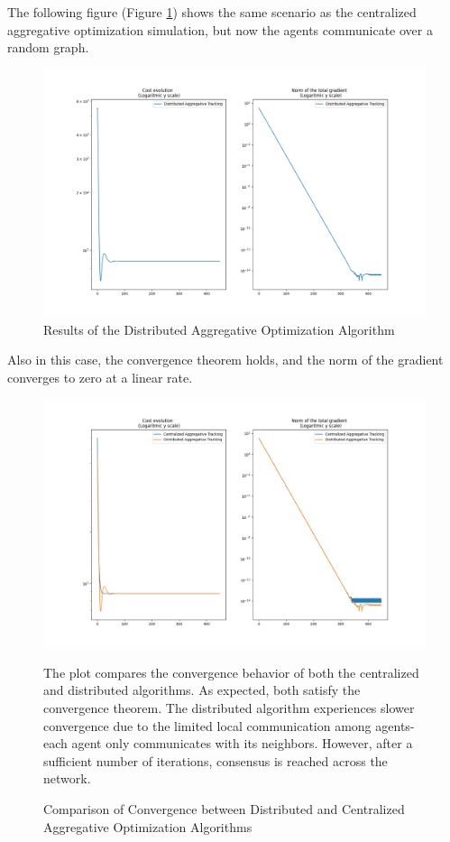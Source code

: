 \noindent The following figure (Figure \ref{fig:distributed_agt})  shows the same scenario as the centralized aggregative optimization simulation, but now the agents communicate over a random graph.

\newpage
\begin{figure}[h!]
    \centering
    \includegraphics[width=0.7\linewidth]{report/figs/distributed_agt.png}
    \caption{Results of the Distributed Aggregative Optimization Algorithm}
    \label{fig:distributed_agt}
\end{figure}
\noindent Also in this case, the convergence theorem holds, and the norm of the gradient converges to zero at a linear rate.

\begin{figure}[h!]
  \centering
  \begin{minipage}{0.5\textwidth}
    \includegraphics[width=\linewidth]{report/figs/comparison_centr_disp_agt.png}
  \end{minipage}%
  \hfill
  \begin{minipage}{0.5\textwidth}
    \small
    The plot compares the convergence behavior of both the centralized and distributed algorithms. As expected, both satisfy the convergence theorem. The distributed algorithm experiences slower convergence due to the limited local communication among agents-each agent only communicates with its neighbors. However, after a sufficient number of iterations, consensus is reached across the network.
  \end{minipage}
  \caption{Comparison of Convergence between Distributed and Centralized Aggregative Optimization Algorithms}
\end{figure}

